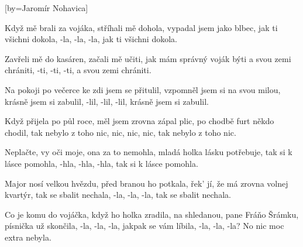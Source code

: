 [by={Jaromír Nohavica}]

\beginverse{}
Když mě brali za vojáka, stříhali mě dohola,
vypadal jsem jako blbec,
jak ti všichni dokola, -la, -la, -la,
jak ti všichni dokola.
\endverse{}

\beginverse{}
\chordsoff{}
Zavřeli mě do kasáren, začali mě učiti,
jak mám správný voják býti
a svou zemi chrániti, -ti, -ti, -ti,
a svou zemi chrániti.
\chordson{}
\endverse{}

\beginverse{}
\chordsoff{}
Na pokoji po večerce ke zdi jsem se přitulil,
vzpomněl jsem si na svou milou,
krásně jsem si zabulil, -lil, -lil, -lil,
krásně jsem si zabulil.
\chordson{}
\endverse{}

\beginverse{}
\chordsoff{}
Když přijela po půl roce, měl jsem zrovna zápal plic,
po chodbě furt někdo chodil,
tak nebylo z toho nic, nic, nic, nic,
tak nebylo z toho nic.
\chordson{}
\endverse{}

\beginverse{}
\chordsoff{}
Neplačte, vy oči moje, ona za to nemohla,
mladá holka lásku potřebuje,
tak si k lásce pomohla, -hla, -hla, -hla,
tak si k lásce pomohla.
\chordson{}
\endverse{}

\beginverse{}
\chordsoff{}
Major nosí velkou hvězdu, před branou ho potkala,
řek' jí, že má zrovna volnej kvartýr,
tak se sbalit nechala, -la, -la, -la,
tak se sbalit nechala.
\chordson{}
\endverse{}

\beginverse{}
\chordsoff{}
Co je komu do vojáčka, když ho holka zradila,
na shledanou, pane Fráňo Šrámku,
písnička už skončila, -la, -la, -la,
jakpak se vám líbila, -la, -la, -la?
No nic moc extra nebyla.
\chordson{}
\endverse{}

\endsong{}
